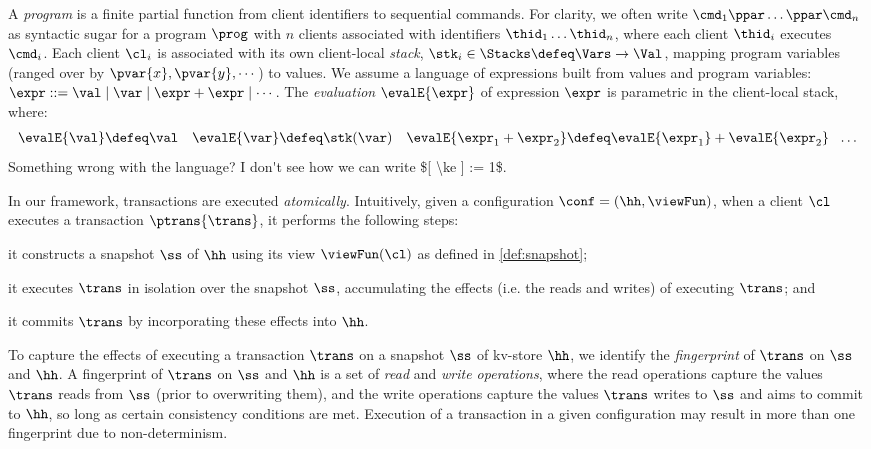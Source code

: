 A {\em program} is a finite partial function from client identifiers to sequential
commands.
For clarity, we often write \( \cmd_{1}\ppar \dots \ppar \cmd_{n}\) as syntactic sugar 
for a program \( \prog \) with $n$ clients associated with identifiers
$\thid_1 \dots \thid_n$, where each client $\thid_i$ executes
$\cmd_i$. 
Each client $\cl_i$ is associated with its own client-local  \emph{stack}, 
$\stk_i \in \Stacks \defeq \Vars \to \Val$,  mapping program variables
(ranged over by $\pvar{x}, \pvar{y}, \cdots$)
to values. 
We assume a language of expressions built from values
and program variables:
$\expr ::= \val \mid \var \mid \expr + \expr \mid \cdots$.
The \emph{evaluation} $\evalE{\expr}$ of  expression $\expr$ is parametric in
the client-local stack, where:
\begin{gather*}
\evalE{\val} \defeq
\val
\quad
\evalE{\var} \defeq
\stk(\var)
\quad
\evalE{\expr_{1} + \expr_{2}} \defeq
\evalE{\expr_{1}} + \evalE{\expr_{2}}
\ \ 
\dots
\end{gather*}
\ac{Something wrong with the language? I don't see 
how we can write $[ \ke ] := 1$.
}

In our framework, transactions are executed \emph{atomically}. 
Intuitively, given a configuration $\conf = (\hh, \viewFun)$, 
when a client $\cl$ executes a transaction $\ptrans{\trans}$, 
it performs the following steps: 
\begin{enumerate*}
	\item it constructs a snapshot $\ss$ of $\hh$ using its view $\viewFun(\cl)$ as defined in \cref{def:snapshot};  
	\item it executes $\trans$ in isolation over the snapshot $\ss$, accumulating the  
effects (i.e. the reads and writes) of executing $\trans$; and
	\item it commits $\trans$ by incorporating these effects into $\hh$.
\end{enumerate*}


To capture the effects of executing a transaction $\trans$ on a snapshot $\ss$ of kv-store $\hh$, 
we identify the \emph{fingerprint} of $\trans$ on $\ss$ and $\hh$.
A fingerprint of $\trans$ on $\ss$ and $\hh$
is a set of \emph{read} and \emph{write operations}, where
the read operations capture the values $\trans$ reads from $\ss$ (prior to overwriting them), and
the write operations capture the values $\trans$ writes to $\ss$ and aims to commit to $\hh$, so long as certain consistency conditions are met.  
Execution of a transaction in a given configuration may result in more than one fingerprint due to non-determinism. 

